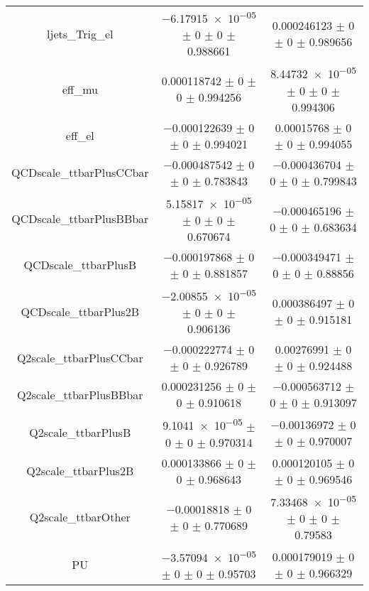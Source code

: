 \begin{table}
\begin{tabular}{ccc}
ljets\_Trig\_el 	& \num{-6.17915e-05} $\pm$ \num{0} $\pm$ \num{0} $\pm$ \num{0.988661} 	& \num{0.000246123} $\pm$ \num{0} $\pm$ \num{0} $\pm$ \num{0.989656}\\
eff\_mu 	& \num{0.000118742} $\pm$ \num{0} $\pm$ \num{0} $\pm$ \num{0.994256} 	& \num{8.44732e-05} $\pm$ \num{0} $\pm$ \num{0} $\pm$ \num{0.994306}\\
eff\_el 	& \num{-0.000122639} $\pm$ \num{0} $\pm$ \num{0} $\pm$ \num{0.994021} 	& \num{0.00015768} $\pm$ \num{0} $\pm$ \num{0} $\pm$ \num{0.994055}\\
QCDscale\_ttbarPlusCCbar 	& \num{-0.000487542} $\pm$ \num{0} $\pm$ \num{0} $\pm$ \num{0.783843} 	& \num{-0.000436704} $\pm$ \num{0} $\pm$ \num{0} $\pm$ \num{0.799843}\\
QCDscale\_ttbarPlusBBbar 	& \num{5.15817e-05} $\pm$ \num{0} $\pm$ \num{0} $\pm$ \num{0.670674} 	& \num{-0.000465196} $\pm$ \num{0} $\pm$ \num{0} $\pm$ \num{0.683634}\\
QCDscale\_ttbarPlusB 	& \num{-0.000197868} $\pm$ \num{0} $\pm$ \num{0} $\pm$ \num{0.881857} 	& \num{-0.000349471} $\pm$ \num{0} $\pm$ \num{0} $\pm$ \num{0.88856}\\
QCDscale\_ttbarPlus2B 	& \num{-2.00855e-05} $\pm$ \num{0} $\pm$ \num{0} $\pm$ \num{0.906136} 	& \num{0.000386497} $\pm$ \num{0} $\pm$ \num{0} $\pm$ \num{0.915181}\\
Q2scale\_ttbarPlusCCbar 	& \num{-0.000222774} $\pm$ \num{0} $\pm$ \num{0} $\pm$ \num{0.926789} 	& \num{0.00276991} $\pm$ \num{0} $\pm$ \num{0} $\pm$ \num{0.924488}\\
Q2scale\_ttbarPlusBBbar 	& \num{0.000231256} $\pm$ \num{0} $\pm$ \num{0} $\pm$ \num{0.910618} 	& \num{-0.000563712} $\pm$ \num{0} $\pm$ \num{0} $\pm$ \num{0.913097}\\
Q2scale\_ttbarPlusB 	& \num{9.1041e-05} $\pm$ \num{0} $\pm$ \num{0} $\pm$ \num{0.970314} 	& \num{-0.00136972} $\pm$ \num{0} $\pm$ \num{0} $\pm$ \num{0.970007}\\
Q2scale\_ttbarPlus2B 	& \num{0.000133866} $\pm$ \num{0} $\pm$ \num{0} $\pm$ \num{0.968643} 	& \num{0.000120105} $\pm$ \num{0} $\pm$ \num{0} $\pm$ \num{0.969546}\\
Q2scale\_ttbarOther 	& \num{-0.00018818} $\pm$ \num{0} $\pm$ \num{0} $\pm$ \num{0.770689} 	& \num{7.33468e-05} $\pm$ \num{0} $\pm$ \num{0} $\pm$ \num{0.79583}\\
PU 	& \num{-3.57094e-05} $\pm$ \num{0} $\pm$ \num{0} $\pm$ \num{0.95703} 	& \num{0.000179019} $\pm$ \num{0} $\pm$ \num{0} $\pm$ \num{0.966329}\\

\end{tabular}
\end{table}
